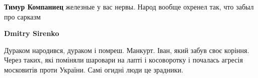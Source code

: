 \begin{itemize}
\begin{itemize}
 
\textbf{Тимур Компаниец} железные у вас нервы. Народ вообще охренел так, что забыл про сарказм 🤣

 
\textbf{Dmitry Sirenko} 

Дураком народився, дураком і помреш. Манкурт. Іван, який
забув своє коріння. Через таких, які поміняли шаровари на лапті і косоворотку і
почалась агресія московитів проти України. Самі огидні люди це зрадники.

\end{itemize}

\end{itemize}

